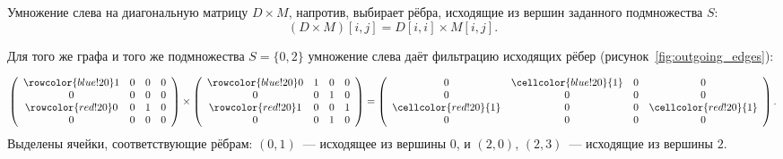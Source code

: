 Умножение слева на диагональную матрицу $D \times M$, напротив, выбирает рёбра, исходящие из вершин заданного подмножества $S$:
\[
    (D \times M)[i,j] = D[i,i] \times M[i,j].
\]

\begin{example}
    Для того же графа и того же подмножества $S = \{0, 2\}$ умножение слева даёт фильтрацию исходящих рёбер (рисунок~\ref{fig:outgoing_edges}):

\begin{marginfigure}
    \begin{center}
        
    \end{center}
    \caption{Фильтрация исходящих рёбер для вершин  и  }
    \label{fig:outgoing_edges}
\end{marginfigure}


    \[
        \left(
        \begin{array}{cccc}
            \rowcolor{blue!20}
            1 & 0 & 0 & 0 \\
            0 & 0 & 0 & 0 \\
            \rowcolor{red!20}
            0 & 0 & 1 & 0 \\
            0 & 0 & 0 & 0
        \end{array}\right)
        \times
        \left(
        \begin{array}{cccc}
            \rowcolor{blue!20}
            0 & 1 & 0 & 0 \\
            0 & 0 & 1 & 0 \\
            \rowcolor{red!20}
            1 & 0 & 0 & 1 \\
            0 & 0 & 1 & 0
        \end{array}\right)
        =
        \left(
        \begin{array}{cccc}
            0 & \cellcolor{blue!20}{1} & 0 & 0 \\
            0 & 0 & 0 & 0 \\
            \cellcolor{red!20}{1} & 0 & 0 & \cellcolor{red!20}{1} \\
            0 & 0 & 0 & 0
        \end{array}\right).
    \]
    Выделены ячейки, соответствующие рёбрам: $(0,1)$~--- исходящее из вершины $0$, и $(2,0)$, $(2,3)$~--- исходящие из вершины $2$.
\end{example}

